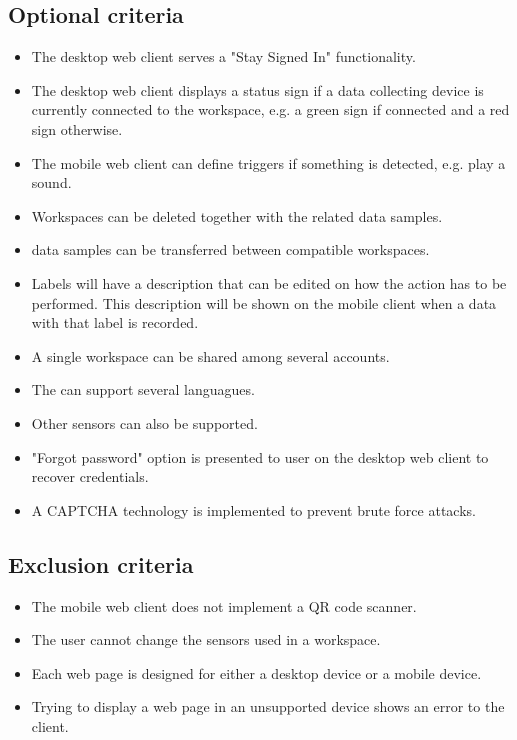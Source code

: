 \subsection{Optional criteria}
\begin{itemize}
    \item The desktop web client serves a "Stay Signed In" functionality.
    \item The desktop web client displays a status sign if a data collecting device is currently connected to the \gls{workspace}, e.g. a green sign if connected and a red sign otherwise.
    \item The mobile web client can define triggers if something is detected, e.g. play a sound.
    \item Workspaces can be deleted together with the related \glspl{data sample}.
    \item \Glspl{data sample} can be transferred between compatible \glspl{workspace}.
    \item Labels will have a description that can be edited on how the action has to be performed. This description will be shown on the mobile client when a data with that \gls{label} is recorded.
    \item A single \gls{workspace} can be shared among several accounts.
    \item The  can support several languagues.
    \item Other \glspl{sensor} can also be supported.
    \item "Forgot password" option is presented to user on the desktop web client to recover credentials.
    \item A \gls{CAPTCHA} technology is implemented to prevent brute force attacks.
\end{itemize}

\subsection{Exclusion criteria}
\begin{itemize}
    \item The mobile web client does not implement a \gls{QR code} scanner.
    \item The user cannot change the \glspl{sensor} used in a \gls{workspace}.
    \item Each web page is designed for either a desktop device or a mobile device.
    \item Trying to display a web page in an unsupported device shows an error to the client.
\end{itemize}
